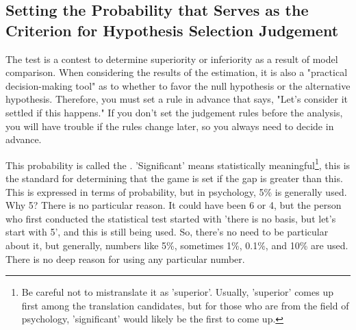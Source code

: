 \documentclass{ltjsbook}
\begin{document}
\subsection{Setting the Probability that Serves as the Criterion for Hypothesis Selection Judgement}
\label{ModelComparison2}
The test is a contest to determine superiority or inferiority as a result of model comparison. When considering the results of the estimation, it is also a "practical decision-making tool" as to whether to favor the null hypothesis or the alternative hypothesis. Therefore, you must set a rule in advance that says, "Let's consider it settled if this happens." If you don't set the judgement rules before the analysis, you will have trouble if the rules change later, so you always need to decide in advance.

This probability is called the . 'Significant' means statistically meaningful\footnote{Be careful not to mistranslate it as 'superior'. Usually, 'superior' comes up first among the translation candidates, but for those who are from the field of psychology, 'significant' would likely be the first to come up.}, this is the standard for determining that the game is set if the gap is greater than this. This is expressed in terms of probability, but in psychology, 5\% is generally used. Why 5? There is no particular reason. It could have been 6 or 4, but the person who first conducted the statistical test started with 'there is no basis, but let's start with 5', and this is still being used. So, there's no need to be particular about it, but generally, numbers like 5\%, sometimes 1\%, 0.1\%, and 10\% are used. There is no deep reason for using any particular number.
\end{document}

